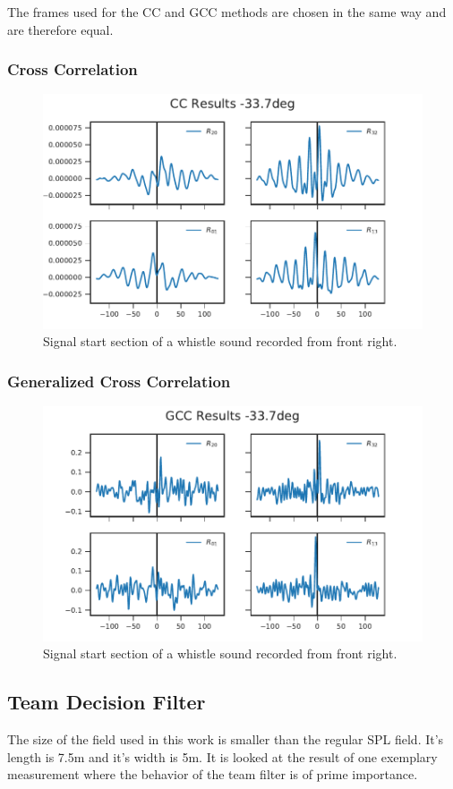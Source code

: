 The frames used for the \ac{CC} and \ac{GCC} methods are chosen in the same way
and are therefore equal.

\subsubsection{Cross Correlation}
\begin{figure}[ht]
	\centering
		\includegraphics[]{figures/evaluation/cc_frontRight_1}
	\caption{Signal start section of a whistle sound recorded from front right.}
	\label{fig:04_tdoaSignal}
\end{figure}

\subsubsection{Generalized Cross Correlation}
\begin{figure}[ht]
	\centering
		\includegraphics[]{figures/evaluation/gcc_frontRight_1}
	\caption{Signal start section of a whistle sound recorded from front right.}
	\label{fig:04_tdoaSignal}
\end{figure}

\subsection{Team Decision Filter}

The size of the field used in this work is smaller than the regular \ac{SPL}
field. It's length is 7.5\si{m} and it's width is 5\si{m}.
It is looked at the result of one exemplary measurement where the behavior
of the team filter is of prime importance.
